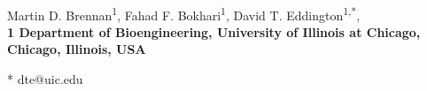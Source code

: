 \documentclass[10pt,letterpaper]{article}
\date{}
\begin{document}
\vspace*{0.35in}

\begin{flushleft}
{\Large
\textbf{}
}
\newline
\\
Martin D. Brennan\textsuperscript{1},
Fahad F. Bokhari\textsuperscript{1},
David T. Eddington\textsuperscript{1,*},
\\
\bigskip
\bf{1} Department of Bioengineering, University of Illinois at Chicago, Chicago, Illinois, USA
\bigskip

% 
%





* dte@uic.edu

\end{flushleft}
\end{document}
